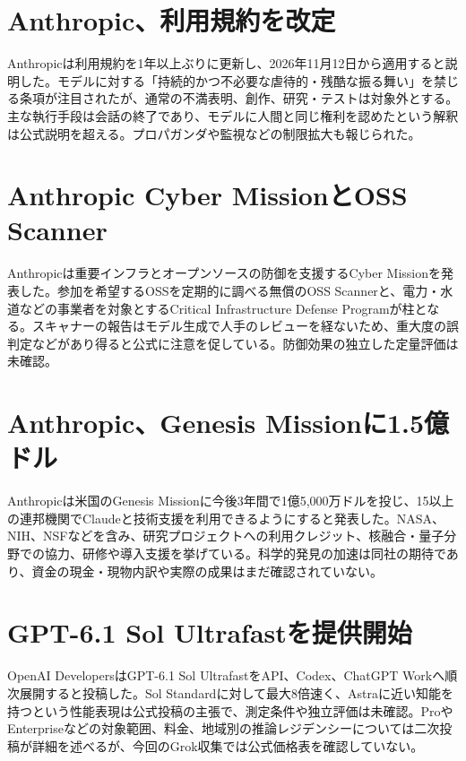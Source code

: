\section{Anthropic、利用規約を改定}
Anthropicは利用規約を1年以上ぶりに更新し、2026年11月12日から適用すると説明した。モデルに対する「持続的かつ不必要な虐待的・残酷な振る舞い」を禁じる条項が注目されたが、通常の不満表明、創作、研究・テストは対象外とする。主な執行手段は会話の終了であり、モデルに人間と同じ権利を認めたという解釈は公式説明を超える。プロパガンダや監視などの制限拡大も報じられた。

\section{Anthropic Cyber MissionとOSS Scanner}
Anthropicは重要インフラとオープンソースの防御を支援するCyber Missionを発表した。参加を希望するOSSを定期的に調べる無償のOSS Scannerと、電力・水道などの事業者を対象とするCritical Infrastructure Defense Programが柱となる。スキャナーの報告はモデル生成で人手のレビューを経ないため、重大度の誤判定などがあり得ると公式に注意を促している。防御効果の独立した定量評価は未確認。

\section{Anthropic、Genesis Missionに1.5億ドル}
Anthropicは米国のGenesis Missionに今後3年間で1億5,000万ドルを投じ、15以上の連邦機関でClaudeと技術支援を利用できるようにすると発表した。NASA、NIH、NSFなどを含み、研究プロジェクトへの利用クレジット、核融合・量子分野での協力、研修や導入支援を挙げている。科学的発見の加速は同社の期待であり、資金の現金・現物内訳や実際の成果はまだ確認されていない。

\section{GPT-6.1 Sol Ultrafastを提供開始}
OpenAI DevelopersはGPT-6.1 Sol UltrafastをAPI、Codex、ChatGPT Workへ順次展開すると投稿した。Sol Standardに対して最大8倍速く、Astraに近い知能を持つという性能表現は公式投稿の主張で、測定条件や独立評価は未確認。ProやEnterpriseなどの対象範囲、料金、地域別の推論レジデンシーについては二次投稿が詳細を述べるが、今回のGrok収集では公式価格表を確認していない。

